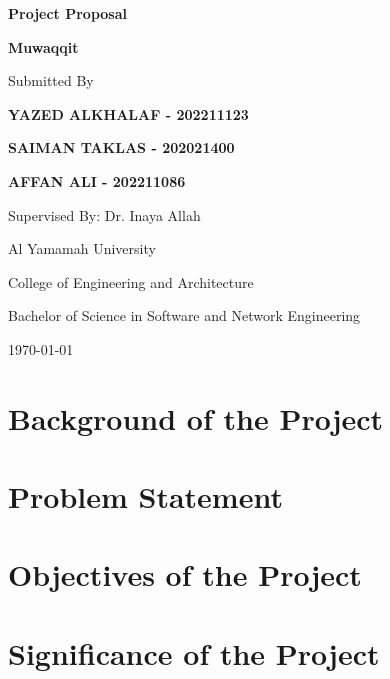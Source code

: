 \documentclass[12pt,a4paper]{article}
\begin{document}
\begin{titlepage}
\begin{center}
\vspace*{2cm}
{\huge\bfseries Project Proposal\par}
\vspace{1.5cm}
{\Large\bfseries Muwaqqit\par}
\vspace{2cm}
{\Large Submitted By\par}
\vspace{1cm}
{\Large\bfseries YAZED ALKHALAF - 202211123\par}
{\Large\bfseries SAIMAN TAKLAS - 202021400\par}
{\Large\bfseries AFFAN ALI - 202211086\par}
\vfill
{\Large Supervised By: Dr. Inaya Allah\par}
\vspace{1cm}
{\Large Al Yamamah University\par}
{\Large College of Engineering and Architecture\par}
{\Large Bachelor of Science in Software and Network Engineering\par}
\vspace{1cm}
{\Large \today\par}
\end{center}
\end{titlepage}

\tableofcontents
\clearpage

\doublespacing

\section{Background of the Project}

\section{Problem Statement}

\section{Objectives of the Project}

\section{Significance of the Project}
\end{document}
